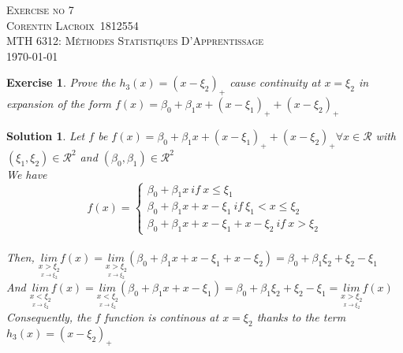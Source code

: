 \documentclass[12pt,a4paper]{article}
\def\StudentName{Corentin Lacroix}
\def\StudentMatricule{1812554}
\def\ExerciseNo{7}
\def\R{\mathcal{R}}%
\newtheorem{exercise}{Exercise}
\newtheorem{solution}{Solution}
\begin{document}
\begin{titlepage}
\begin{center}
\textsc{\LARGE Exercise no \ExerciseNo}\\[1.5cm]
\vspace{2in}
\textsc{\Large \StudentName~\StudentMatricule}\\[0.5cm]
\textsc{MTH 6312: Méthodes Statistiques D'Apprentissage}\\[0.5cm]
\today
\end{center}
\end{titlepage}

\begin{exercise}
Prove the $h_3(x) = (x-\xi_2)_+$ cause continuity at $x=\xi_2$ in expansion of the form $f(x) = \beta_0 + \beta_1x + (x-\xi_1)_+ + (x-\xi_2)_+$
\end{exercise}
\begin{solution}
Let $f$ be $f(x) = \beta_0 + \beta_1 x + (x - \xi_1)_+ + (x - \xi_2)_+ \forall x \in \R$ with $(\xi_1, \xi_2) \in \R^2$ and $(\beta_0, \beta_1) \in \R^2$ \\
We have \[f(x)=\begin{cases}
               \beta_0 + \beta_1 x \ if\ x\leq \xi_1\\
               \beta_0 + \beta_1 x + x - \xi_1\ if\ \xi_1 < x \leq \xi_2\\
			   \beta_0 + \beta_1 x + x - \xi_1 + x - \xi_2\ if\ x > \xi_2            
			   \end{cases}\]\\
			   
Then, $\underset{\underset{x\rightarrow\xi_2}{x > \xi_2}}{lim}f(x) = \underset{\underset{x\rightarrow\xi_2}{x > \xi_2}}{lim}(\beta_0 + \beta_1 x + x - \xi_1 + x - \xi_2) = \beta_0 + \beta_1 \xi_2 + \xi_2 - \xi_1$\\

And $\underset{\underset{x\rightarrow\xi_2}{x < \xi_2}}{lim}f(x) = \underset{\underset{x\rightarrow\xi_2}{x < \xi_2}}{lim}(\beta_0 + \beta_1 x + x - \xi_1) = \beta_0 + \beta_1 \xi_2 + \xi_2 - \xi_1 = \underset{\underset{x\rightarrow\xi_2}{x > \xi_2}}{lim}f(x)$\\

Consequently, the $f$ function is continous at $x=\xi_2$ thanks to the term $h_3(x) = (x - \xi_2)_+$
\end{solution}
\end{document}
